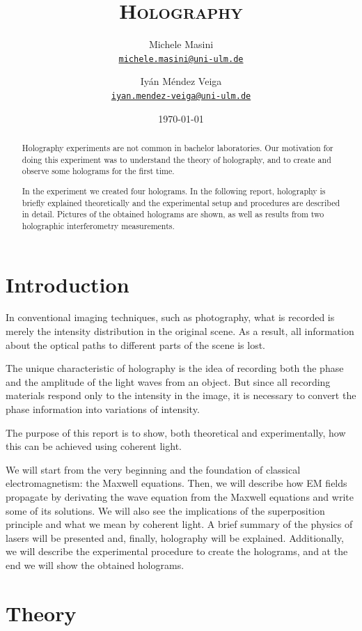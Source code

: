 \documentclass[11pt,a4paper]{article}
\title{\bfseries\textsc{Holography}}
\author{
Michele Masini\\ \small\texttt{\href{mailto:michele.masini@uni-ulm.de}{michele.masini@uni-ulm.de}}\and
Iyán Méndez Veiga\\ \small\texttt{\href{mailto:iyan.mendez-veiga@uni-ulm.de}{iyan.mendez-veiga@uni-ulm.de}}
}
\date{\today}
\begin{document}
\maketitle

\begin{abstract}
Holography experiments are not common in bachelor laboratories. Our motivation for doing this experiment was to understand the theory of holography, and to create and observe some holograms for the first time.

In the experiment we created four holograms. In the following report, holography is briefly explained theoretically and the experimental setup and procedures are described in detail. Pictures of the obtained holograms are shown, as well as results from two holographic interferometry measurements.
\end{abstract}


\section{Introduction}

In conventional imaging techniques, such as photography, what is recorded is merely the intensity distribution in the original scene. As a result, all information about the optical paths to different parts of the scene is lost.

The unique characteristic of holography is the idea of recording both the phase and the amplitude of the light waves from an object. But since all recording materials respond only to the intensity in the image, it is necessary to convert the phase information into variations of intensity.

The purpose of this report is to show, both theoretical and experimentally, how this can be achieved using coherent light.

We will start from the very beginning and the foundation of classical electromagnetism: the Maxwell equations. Then, we will describe how EM fields propagate by derivating the wave equation from the Maxwell equations and write some of its solutions. We will also see the implications of the superposition principle and what we mean by coherent light. A brief summary of the physics of lasers will be presented and, finally, holography will be explained. Additionally, we will describe the experimental procedure to create the holograms, and at the end we will show the obtained holograms.


\section{Theory}
\end{document}
